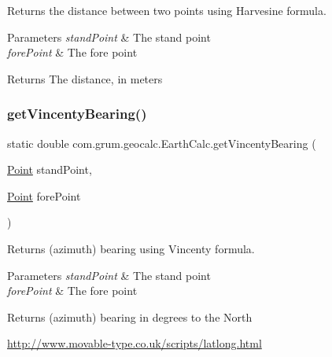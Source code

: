 Returns the distance between two points using Harvesine formula.


\begin{DoxyParams}{Parameters}
{\em stand\+Point} & The stand point \\
\hline
{\em fore\+Point} & The fore point \\
\hline
\end{DoxyParams}
\begin{DoxyReturn}{Returns}
The distance, in meters 
\end{DoxyReturn}
\mbox{\label{classcom_1_1grum_1_1geocalc_1_1_earth_calc_a2e7117867ddb60e6c1edd6b52b700c04}} 
\subsubsection{\texorpdfstring{get\+Vincenty\+Bearing()}{getVincentyBearing()}}
{\footnotesize\ttfamily static double com.\+grum.\+geocalc.\+Earth\+Calc.\+get\+Vincenty\+Bearing (\begin{DoxyParamCaption}\item[{\mbox{\hyperlink{classcom_1_1grum_1_1geocalc_1_1_point}{Point}}}]{stand\+Point,  }\item[{\mbox{\hyperlink{classcom_1_1grum_1_1geocalc_1_1_point}{Point}}}]{fore\+Point }\end{DoxyParamCaption})\hspace{0.3cm}{\ttfamily [static]}}

Returns (azimuth) bearing using Vincenty formula.


\begin{DoxyParams}{Parameters}
{\em stand\+Point} & The stand point \\
\hline
{\em fore\+Point} & The fore point \\
\hline
\end{DoxyParams}
\begin{DoxyReturn}{Returns}
(azimuth) bearing in degrees to the North
\end{DoxyReturn}
\mbox{\hyperlink{}{http\+://www.\+movable-\/type.\+co.\+uk/scripts/latlong.\+html}}\mbox{\label{classcom_1_1grum_1_1geocalc_1_1_earth_calc_a100d8071635948032b85483aeb2d3ff3}} 
